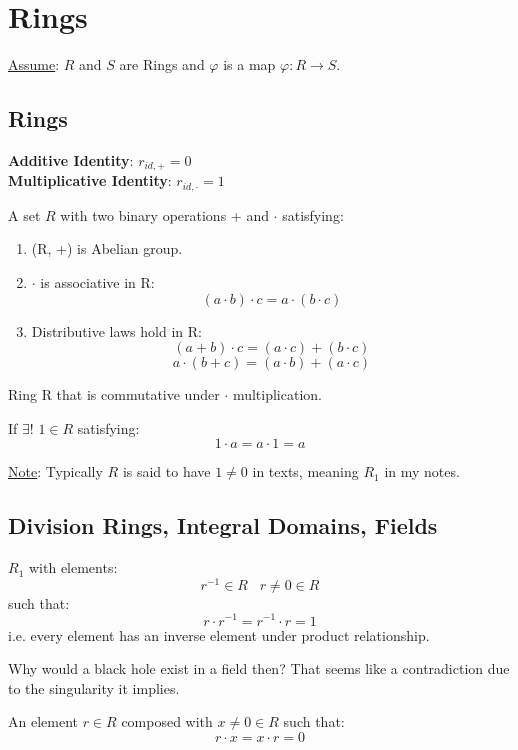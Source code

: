 \chapter{Rings}
\underline{Assume}: $R$ and $S$ are Rings and $\varphi$ is a map $\varphi: R \to S$. 


\section{Rings}
\textbf{Additive Identity}: ${r}_{id, +} = 0$ \\ 
\textbf{Multiplicative Identity}: ${r}_{id, \cdot } = 1$
\begin{defn}[Ring $R$]
	A set $R$ with two binary operations + and $\cdot$ satisfying:
	\begin{enumerate}
		\item (R, +) is Abelian group.
		\item $\cdot$ is associative in R:
		\[(a \cdot b) \cdot c = a \cdot (b \cdot c)\]
		\item Distributive laws hold in R:
		\[(a + b) \cdot c = (a \cdot c) + (b \cdot c)\]
		\[a \cdot (b + c) = (a \cdot b) + (a \cdot c) \]
	\end{enumerate}
\end{defn}

\begin{defn}
	Ring R that is commutative under $\cdot$ multiplication.
\end{defn}

\begin{defn}
	If $\exists!$ $1  \in R$ satisfying:
	\[ 1  \cdot a = a \cdot 1 = a\]
\end{defn}
\underline{Note}: Typically $R$ is said to have $1 \not = 0$ in texts, meaning ${R}_{1}$ in my notes. 

\section{Division Rings, Integral Domains, Fields}
\begin{defn} ${R}_{1}$ with elements:
	\[ {r}^{-1} \in R \; \; \; r \not = 0 \in R \] 
	such that:
	\[ r \cdot {r}^{-1} = {r}^{-1} \cdot r = 1\]
	i.e. every element has an inverse element under product relationship.
\end{defn}
Why would a black hole exist in a field then? That seems like a contradiction due to the singularity it implies.
\begin{defn}
		An element $r \in R$ composed with $x \not = 0 \in R$ such that:
	\[ r \cdot x = x \cdot r = 0 \]
\end{defn}


